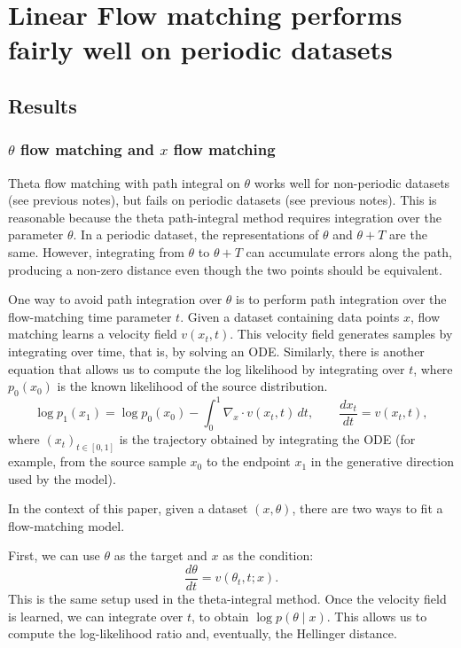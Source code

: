 \section{Linear Flow matching performs fairly well on periodic datasets}

\subsection{Results}

\subsubsection{$\theta$ flow matching and $x$ flow matching}

Theta flow matching with path integral on $\theta$ works well for non-periodic datasets (see previous notes), but fails on periodic datasets (see previous notes). This is reasonable because the theta path-integral method requires integration over the parameter $\theta$. In a periodic dataset, the representations of $\theta$ and $\theta+T$ are the same. However, integrating from $\theta$ to $\theta+T$ can accumulate errors along the path, producing a non-zero distance even though the two points should be equivalent.

One way to avoid path integration over $\theta$ is to perform path integration over the flow-matching time parameter $t$. Given a dataset containing data points $x$, flow matching learns a velocity field $v(x_t, t)$. This velocity field generates samples by integrating over time, that is, by solving an ODE. Similarly, there is another equation that allows us to compute the log likelihood by integrating over $t$, where $p_0(x_0)$ is the known likelihood of the source distribution.
\[
\log p_1(x_1)
=
\log p_0(x_0)
-
\int_0^1
\nabla_x \cdot v(x_t, t)\, dt,
\qquad
\frac{dx_t}{dt} = v(x_t, t),
\]
where $(x_t)_{t\in[0,1]}$ is the trajectory obtained by integrating the ODE (for example, from the source sample $x_0$ to the endpoint $x_1$ in the generative direction used by the model).

In the context of this paper, given a dataset $(x,\theta)$, there are two ways to fit a flow-matching model.

First, we can use $\theta$ as the target and $x$ as the condition:
\[
\frac{d\theta}{dt} = v(\theta_t, t; x).
\]
This is the same setup used in the theta-integral method. Once the velocity field is learned, we can integrate over $t$, to obtain $\log p(\theta \mid x)$. This allows us to compute the log-likelihood ratio and, eventually, the Hellinger distance.

